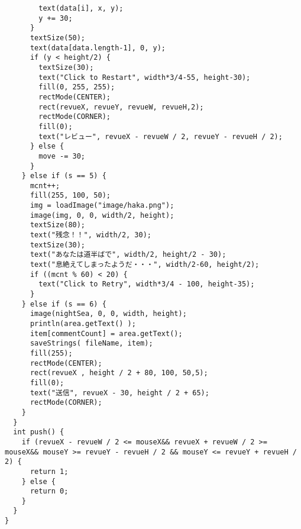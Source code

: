 \documentclass{jsarticle}
\begin{document}
\begin{tiny}
\begin{lstlisting}
        text(data[i], x, y);
        y += 30;
      }
      textSize(50);
      text(data[data.length-1], 0, y);
      if (y < height/2) {
        textSize(30);
        text("Click to Restart", width*3/4-55, height-30);
        fill(0, 255, 255);
        rectMode(CENTER);
        rect(revueX, revueY, revueW, revueH,2);
        rectMode(CORNER);
        fill(0);
        text("レビュー", revueX - revueW / 2, revueY - revueH / 2);
      } else {
        move -= 30;
      }
    } else if (s == 5) {
      mcnt++;
      fill(255, 100, 50);
      img = loadImage("image/haka.png");
      image(img, 0, 0, width/2, height);
      textSize(80);
      text("残念！！", width/2, 30);
      textSize(30);
      text("あなたは道半ばで", width/2, height/2 - 30);
      text("息絶えてしまったようだ・・・", width/2-60, height/2);
      if ((mcnt % 60) < 20) {
        text("Click to Retry", width*3/4 - 100, height-35);
      }
    } else if (s == 6) {
      image(nightSea, 0, 0, width, height);
      println(area.getText() );
      item[commentCount] = area.getText();
      saveStrings( fileName, item);
      fill(255);
      rectMode(CENTER);
      rect(revueX , height / 2 + 80, 100, 50,5);
      fill(0); 
      text("送信", revueX - 30, height / 2 + 65);
      rectMode(CORNER);
    }
  }
  int push() {
    if (revueX - revueW / 2 <= mouseX&& revueX + revueW / 2 >= mouseX&& mouseY >= revueY - revueH / 2 && mouseY <= revueY + revueH / 2) {
      return 1;
    } else {
      return 0;
    }
  }
}
  \end{lstlisting}
\end{tiny}
\end{document}
